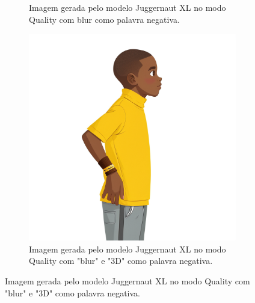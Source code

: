 \begin{figure}[htbp]
\begin{subfigure}{0.35\linewidth}
        \caption{\small Imagem gerada pelo modelo Juggernaut XL no modo Quality com blur como palavra negativa.}
        \label{fig:cgDream8d}
    \end{subfigure}
    \begin{subfigure}{0.35\linewidth}
        \centering
        \includegraphics[width=1\linewidth]{figs/cgDream/res_char_jug_estilo1c.png}
        \caption{\small Imagem gerada pelo modelo Juggernaut XL no modo Quality com "blur" e "3D" como palavra negativa.}
        \label{fig:cgDream8e}
    \end{subfigure}
\end{figure}

